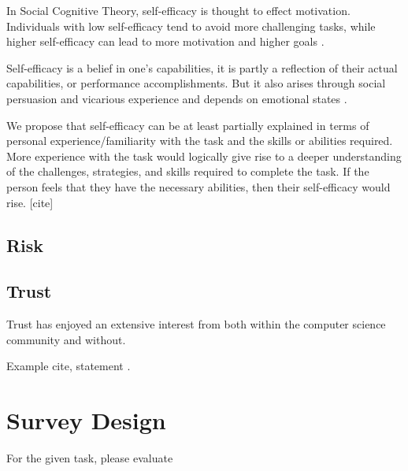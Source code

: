 \documentclass[letterpaper]{article} %
\begin{document}
In Social Cognitive Theory, self-efficacy is thought to effect motivation.  Individuals with low self-efficacy tend to avoid more challenging tasks, while higher self-efficacy can lead to more motivation and higher goals \cite{Bandura-89}.

Self-efficacy is a belief in one's capabilities, it is partly a reflection of their actual capabilities, or performance accomplishments. But it also arises through social persuasion and vicarious experience and depends on emotional states \cite{Bandura-89}.

We propose that self-efficacy can be at least partially explained in terms of personal experience/familiarity with the task and the skills or abilities required. More experience with the task would logically give rise to a deeper understanding of the challenges, strategies, and skills required to complete the task. If the person feels that they have the necessary abilities, then their self-efficacy would rise. [cite]

\subsection{Risk}


\subsection{Trust}
Trust has enjoyed an extensive interest from both within the computer science community and without.

Example cite, statement \cite{lee}.


\section{Survey Design}
For the given task, please evaluate 
\end{document}
